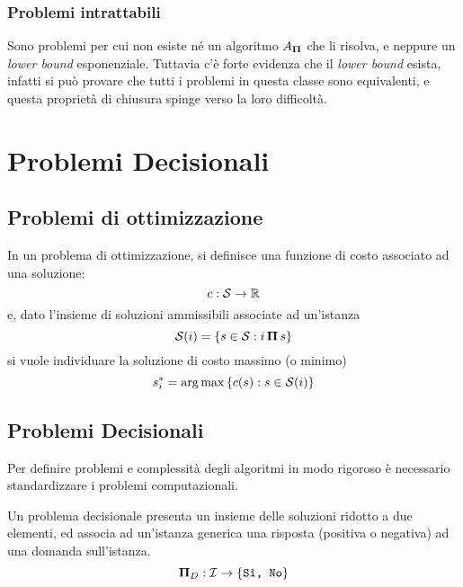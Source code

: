 \subsubsection{Problemi intrattabili}

Sono problemi per cui non esiste né un algoritmo $A_{\bm{\Pi}{}}$ che li risolva, e neppure un \emph{lower bound} esponenziale.
Tuttavia c'è forte evidenza che il \emph{lower bound} esista, infatti si può provare che tutti i problemi in questa classe sono equivalenti, e questa proprietà di chiusura spinge verso la loro difficoltà.

\section{Problemi Decisionali}

\subsection{Problemi di ottimizzazione}

In un problema di ottimizzazione, si definisce una funzione di costo associato ad una soluzione:
\begin{equation*}
    c : \mathcal{S}{} \to \mathbb{R}
\end{equation*}
e, dato l'insieme di soluzioni ammissibili associate ad un'istanza
\begin{equation*}
    \mathcal{S}{} (i) = \left\{ s \in \mathcal{S}{} : i \, \bm{\Pi}{} \, s \right\}
\end{equation*}
si vuole individuare la soluzione di costo massimo (o minimo)
\begin{equation*}
    s_{i}^{*} = \operatorname*{arg\,max} \left\{ c(s) : s \in \mathcal{S}{} (i) \right\}
\end{equation*}

\subsection{Problemi Decisionali}

Per definire problemi e complessità degli algoritmi in modo rigoroso è necessario standardizzare i problemi computazionali.

Un problema decisionale presenta un insieme delle soluzioni ridotto a due elementi, ed associa ad un'istanza generica una risposta (positiva o negativa) ad una domanda sull'istanza.
\begin{equation*}
    \bm{\Pi}{}_{D} : \mathcal{I}{} \to \left\{ \texttt{Sì, No} \right\}
\end{equation*}


